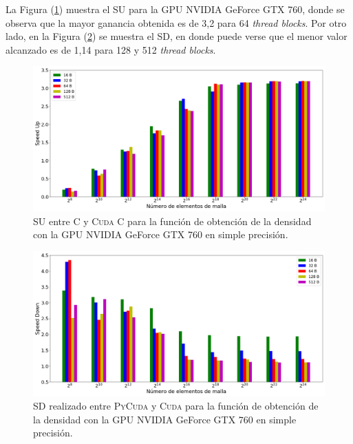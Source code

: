 La Figura (\ref{fig:s_cuda_760_test_simple_10}) muestra el SU para la GPU NVIDIA GeForce GTX 760, donde se observa que la mayor ganancia obtenida es de 3,2 para 64 \textit{thread blocks}. Por otro lado, en la Figura (\ref{fig:s_py_760_test_simple_10}) se muestra el SD, en donde puede verse que el menor valor alcanzado es de 1,14 para 128 y 512  \textit{thread blocks}.

\begin{figure}[h!]
	\centering
	\includegraphics[width=\textwidth]{figs_2/cap4/s_cuda_760_test_simple_10}
	\caption{SU entre \textsc{C} y \textsc{Cuda C} para la función de obtención de la densidad con la GPU NVIDIA GeForce GTX 760 en simple precisión.} 
	\label{fig:s_cuda_760_test_simple_10}	
\end{figure}





\begin{figure}[h!]
	\centering
	\includegraphics[width=\textwidth]{figs_2/cap4/s_py_760_test_simple_10}
	\caption{SD realizado entre \textsc{PyCuda} y \textsc{Cuda} para la función de obtención de la densidad con la GPU NVIDIA GeForce GTX 760 en simple precisión.} 
	\label{fig:s_py_760_test_simple_10}	
\end{figure}


